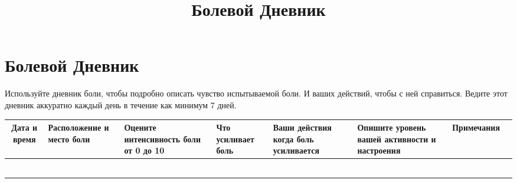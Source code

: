\documentclass{../../shared/worksheet}
\title{Болевой Дневник}
\begin{document}
\section*{\huge{Болевой Дневник}}

\begin{flushleft}
{Используйте дневник боли, чтобы подробно описать чувство испытываемой боли. И
ваших действий, чтобы с ней справиться. Ведите этот дневник аккуратно каждый день в течение как минимум 7 дней. }
\end{flushleft}

\begin{table}[htbp]
\begin{center}
\renewcommand{\arraystretch}{1.8}
\begin{tabularx}{\textwidth}{|>{\small}c|Y|Y|Y|Y|Y|Y|Y|}
\hline
\textbf{Дата и время} & \textbf{Расположение и место боли} & \textbf{Оцените
  интенсивность боли от 0 до 10} & \textbf{Что усиливает боль} & \textbf{Ваши
  действия когда боль усиливается} & \textbf{Опишите уровень вашей активности и
  настроения} & \textbf{Примечания} \\
\hline
 & & & & & &  \\[26pt]
\hline
 & & & & & &  \\[26pt]
\hline
 & & & & & &  \\[26pt]
\hline
 & & & & & &  \\[26pt]
\hline
 & & & & & &  \\[26pt]
\hline
 & & & & & &  \\[26pt]
\hline
\end{tabularx}
\end{center}
\label{tab:activity_diary}
\end{table}
\end{document}
